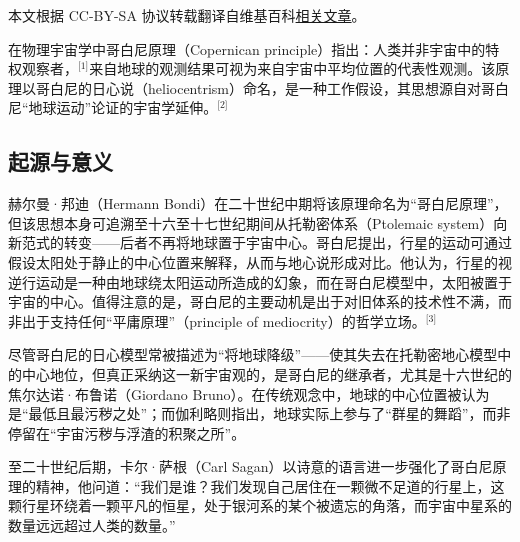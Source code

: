 
本文根据 CC-BY-SA 协议转载翻译自维基百科\href{https://en.wikipedia.org/wiki/Copernican_principle}{相关文章}。

在物理宇宙学中哥白尼原理（Copernican principle）指出：人类并非宇宙中的特权观察者，\(^\text{[1]}\)来自地球的观测结果可视为来自宇宙中平均位置的代表性观测。该原理以哥白尼的日心说（heliocentrism）命名，是一种工作假设，其思想源自对哥白尼“地球运动”论证的宇宙学延伸。\(^\text{[2]}\)
\subsection{起源与意义}
赫尔曼·邦迪（Hermann Bondi）在二十世纪中期将该原理命名为“哥白尼原理”，但该思想本身可追溯至十六至十七世纪期间从托勒密体系（Ptolemaic system）向新范式的转变——后者不再将地球置于宇宙中心。哥白尼提出，行星的运动可通过假设太阳处于静止的中心位置来解释，从而与地心说形成对比。他认为，行星的视逆行运动是一种由地球绕太阳运动所造成的幻象，而在哥白尼模型中，太阳被置于宇宙的中心。值得注意的是，哥白尼的主要动机是出于对旧体系的技术性不满，而非出于支持任何“平庸原理”（principle of mediocrity）的哲学立场。\(^\text{[3]}\)

尽管哥白尼的日心模型常被描述为“将地球降级”——使其失去在托勒密地心模型中的中心地位，但真正采纳这一新宇宙观的，是哥白尼的继承者，尤其是十六世纪的焦尔达诺·布鲁诺（Giordano Bruno）。在传统观念中，地球的中心位置被认为是“最低且最污秽之处”；而伽利略则指出，地球实际上参与了“群星的舞蹈”，而非停留在“宇宙污秽与浮渣的积聚之所”。\cite{ref4, ref5}  

至二十世纪后期，卡尔·萨根（Carl Sagan）以诗意的语言进一步强化了哥白尼原理的精神，他问道：“我们是谁？我们发现自己居住在一颗微不足道的行星上，这颗行星环绕着一颗平凡的恒星，处于银河系的某个被遗忘的角落，而宇宙中星系的数量远远超过人类的数量。”\cite{ref6}
